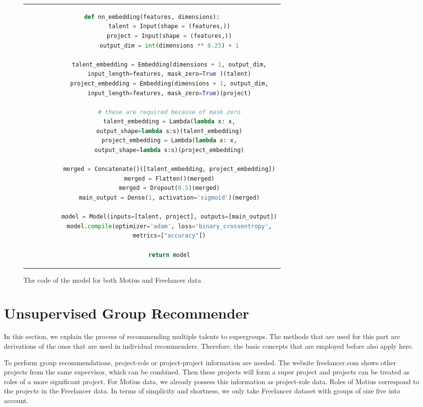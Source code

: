 \begin{figure}[!ht]
	\centering
	\begin{tabular}{c}
		\begin{lstlisting}[language=Python]
		def nn_embedding(features, dimensions):
		  talent = Input(shape = (features,))
		  project = Input(shape = (features,))
		  output_dim = int(dimensions ** 0.25) + 1
		
		  talent_embedding = Embedding(dimensions + 1, output_dim,
		  input_length=features, mask_zero=True )(talent)
		  project_embedding = Embedding(dimensions + 1, output_dim,
		  input_length=features, mask_zero=True)(project)
		
		  # these are required because of mask zero
		  talent_embedding = Lambda(lambda x: x,
		  output_shape=lambda s:s)(talent_embedding)
		  project_embedding = Lambda(lambda x: x,
		  output_shape=lambda s:s)(project_embedding)
		
		  merged = Concatenate()([talent_embedding, project_embedding])
		  merged = Flatten()(merged)
		  merged = Dropout(0.5)(merged)
		  main_output = Dense(1, activation='sigmoid')(merged)
		
		  model = Model(inputs=[talent, project], outputs=[main_output])
		  model.compile(optimizer='adam', loss='binary_crossentropy',
		  metrics=["accuracy"])
		
		  return model
		\end{lstlisting}
	\end{tabular}
	\caption[Model Code]{The code of the model for both Motius and Freelancer data}\label{fig:model-code}
\end{figure}

\section{Unsupervised Group Recommender}\label{section:unsupervised-group-rec}

In this section, we explain the process of recommending multiple talents to supergroups. The methods that are used for this part are derivations of the ones that are used in individual recommenders. Therefore, the basic concepts that are employed before also apply here. 

To perform group recommendations, project-role or project-project information are needed. The website freelancer.com shows other projects from the same supervisor, which can be combined. Then these projects will form a super project and projects can be treated as roles of a more significant project. For Motius data, we already possess this information as project-role data. Roles of Motius correspond to the projects in the Freelancer data. In terms of simplicity and shortness, we only take Freelancer dataset with groups of size five into account. 

